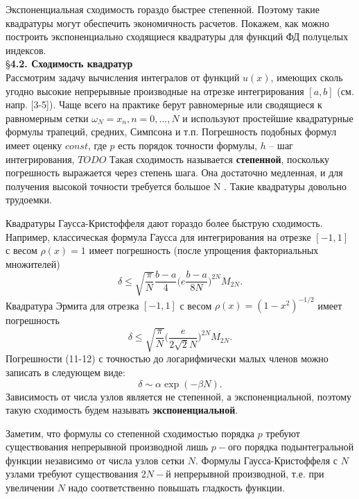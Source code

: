 Экспоненциальная сходимость гораздо быстрее степенной. Поэтому такие квадратуры могут обеспечить экономичность расчетов. Покажем, как можно построить экспоненциально сходящиеся квадратуры для функций ФД полуцелых индексов.
\\


\S \textbf{4.2. Сходимость квадратур}
\\

Рассмотрим задачу вычисления интегралов от
функций $u(x)$, имеющих сколь угодно высокие непрерывные производные на
отрезке интегрирования $[a,b]$ (см. напр. [3-5]). Чаще всего на практике берут
равномерные или сводящиеся к равномерным сетки $ \omega_N={x_n,n=0,...,N}$ и
используют простейшие квадратурные формулы трапеций, средних, Симпсона
и т.п. Погрешность подобных формул имеет оценку
$const$, где $p$ есть порядок точности формулы, $h$ – шаг интегрирования, $TODO$ Такая сходимость называется
\textbf{степенной}, поскольку погрешность выражается через степень шага. Она
достаточно медленная, и для получения высокой точности требуется большое N .
Такие квадратуры довольно трудоемки.

Квадратуры Гаусса-Кристоффеля дают гораздо более быструю
сходимость. Например, классическая формула Гаусса для интегрирования на
отрезке $[-1,1]$ с весом $\rho(x)=1$ имеет погрешность (после упрощения
факториальных множителей)
\begin{equation}
\delta  \leqslant \sqrt{\frac{\pi}{N}}\frac{b-a}{4}\Bigg(e\frac{b-a}{8N}\Bigg)^{2N}M_{2N}.
\end{equation}
Квадратура Эрмита для отрезка $[-1,1]$ с весом $\rho(x)=(1-x^2)^{-1/2}$ имеет
погрешность
\begin{equation}
\delta \leqslant \sqrt{\frac{\pi}{N}}\Bigg(\frac{e}{2\sqrt{2}N}\Bigg)^{2N}M_{2N}.
\end{equation}
Погрешности (11-12) с точностью до логарифмически малых членов можно
записать в следующем виде:
\begin{equation}
\delta \sim \alpha \exp{(-\beta N)}.
\end{equation}
Зависимость от числа узлов является не степенной, а экспоненциальной,
поэтому такую сходимость будем называть \textbf{экспоненциальной}.

Заметим, что формулы со степенной сходимостью порядка $p$ требуют существования непрерывной производной лишь $p-$ого порядка подынтегральной функции независимо от числа узлов сетки $N$. Формулы Гаусса-Кристоффеля с $N$ узлами требуют существования $2N-$й непрерывной производной, т.е. при увеличении $N$ надо соответственно повышать гладкость функции.

